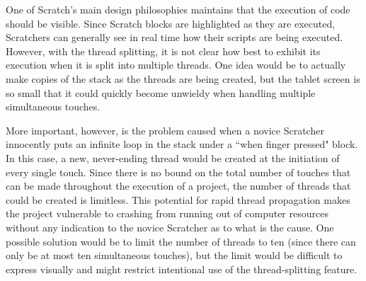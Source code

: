 One of Scratch's main design philosophies maintains that the execution of code should be visible. Since Scratch blocks are highlighted as they are executed, Scratchers can generally see in real time how their scripts are being executed. However, with the thread splitting, it is not clear how best to exhibit its execution when it is split into multiple threads. One idea would be to actually make copies of the stack as the threads are being created, but the tablet screen is so small that it could quickly become unwieldy when handling multiple simultaneous touches.

More important, however, is the problem caused when a novice Scratcher innocently puts an infinite loop in the stack under a ``when finger pressed" block. In this case, a new, never-ending thread would be created at the initiation of every single touch. Since there is no bound on the total number of touches that can be made throughout the execution of a project, the number of threads that could be created is limitless. This potential for rapid thread propagation makes the project vulnerable to crashing from running out of computer resources without any indication to the novice Scratcher as to what is the cause. One possible solution would be to limit the number of threads to ten (since there can only be at most ten simultaneous touches), but the limit would be difficult to express visually and might restrict intentional use of the thread-splitting feature.


